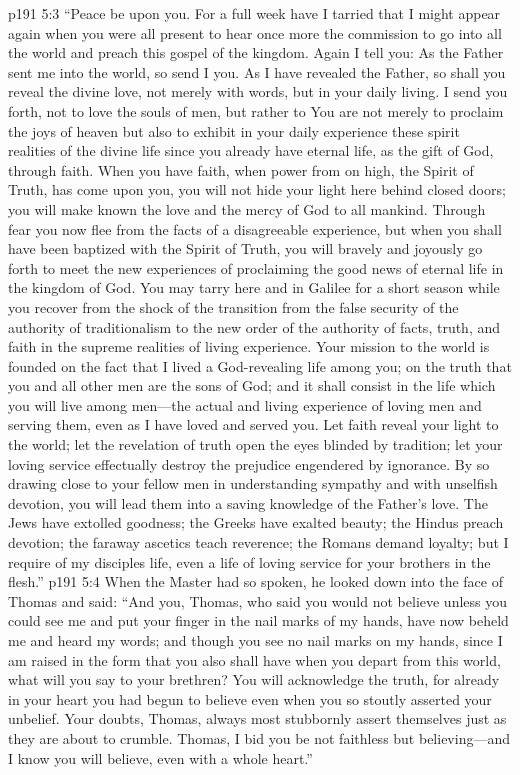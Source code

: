 \vs p191 5:3 “Peace be upon you. For a full week have I tarried that I might appear again when you were all present to hear once more the commission to go into all the world and preach this gospel of the kingdom. Again I tell you: As the Father sent me into the world, so send I you. As I have revealed the Father, so shall you reveal the divine love, not merely with words, but in your daily living. I send you forth, not to love the souls of men, but rather to  You are not merely to proclaim the joys of heaven but also to exhibit in your daily experience these spirit realities of the divine life since you already have eternal life, as the gift of God, through faith. When you have faith, when power from on high, the Spirit of Truth, has come upon you, you will not hide your light here behind closed doors; you will make known the love and the mercy of God to all mankind. Through fear you now flee from the facts of a disagreeable experience, but when you shall have been baptized with the Spirit of Truth, you will bravely and joyously go forth to meet the new experiences of proclaiming the good news of eternal life in the kingdom of God. You may tarry here and in Galilee for a short season while you recover from the shock of the transition from the false security of the authority of traditionalism to the new order of the authority of facts, truth, and faith in the supreme realities of living experience. Your mission to the world is founded on the fact that I lived a God\hyp{}revealing life among you; on the truth that you and all other men are the sons of God; and it shall consist in the life which you will live among men---the actual and living experience of loving men and serving them, even as I have loved and served you. Let faith reveal your light to the world; let the revelation of truth open the eyes blinded by tradition; let your loving service effectually destroy the prejudice engendered by ignorance. By so drawing close to your fellow men in understanding sympathy and with unselfish devotion, you will lead them into a saving knowledge of the Father’s love. The Jews have extolled goodness; the Greeks have exalted beauty; the Hindus preach devotion; the faraway ascetics teach reverence; the Romans demand loyalty; but I require of my disciples life, even a life of loving service for your brothers in the flesh.”\plusone
\vs p191 5:4 When the Master had so spoken, he looked down into the face of Thomas and said: \textcolor{ubdarkred}{“And you, Thomas, who said you would not believe unless you could see me and put your finger in the nail marks of my hands, have now beheld me and heard my words; and though you see no nail marks on my hands, since I am raised in the form that you also shall have when you depart from this world, what will you say to your brethren? You will acknowledge the truth, for already in your heart you had begun to believe even when you so stoutly asserted your unbelief. Your doubts, Thomas, always most stubbornly assert themselves just as they are about to crumble. Thomas, I bid you be not faithless but believing---and I know you will believe, even with a whole heart.”}
